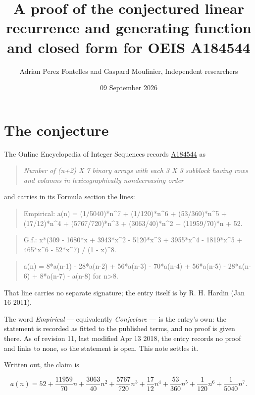 \documentclass[11pt]{article}
\title{A proof of the conjectured linear recurrence and generating function and closed form for OEIS A184544}
\author{Adrian Perez Fontelles and Gaspard Moulinier, Independent researchers}
\date{09 September 2026}
\theoremstyle{definition}
\begin{document}
\maketitle
\section{The conjecture}

The Online Encyclopedia of Integer Sequences records \href{https://oeis.org/A184544}{A184544} as

\begin{quote}\itshape Number of (n+2) X 7 binary arrays with each 3 X 3 subblock having rows and columns in lexicographically nondecreasing order\end{quote}

and carries in its Formula section the lines:

\begin{quote}\ttfamily Empirical: a(n) = (1/5040)*n\textasciicircum{}7 + (1/120)*n\textasciicircum{}6 + (53/360)*n\textasciicircum{}5 + (17/12)*n\textasciicircum{}4 + (5767/720)*n\textasciicircum{}3 + (3063/40)*n\textasciicircum{}2 + (11959/70)*n + 52.\end{quote}

\begin{quote}\ttfamily G.f.: x*(309 - 1680*x + 3943*x\textasciicircum{}2 - 5120*x\textasciicircum{}3 + 3955*x\textasciicircum{}4 - 1819*x\textasciicircum{}5 + 465*x\textasciicircum{}6 - 52*x\textasciicircum{}7) / (1 - x)\textasciicircum{}8.\end{quote}

\begin{quote}\ttfamily a(n) = 8*a(n-1) - 28*a(n-2) + 56*a(n-3) - 70*a(n-4) + 56*a(n-5) - 28*a(n-6) + 8*a(n-7) - a(n-8) for n>8.\end{quote}

That line carries no separate signature; the entry itself is by R. H. Hardin (Jan 16 2011).

The word {\itshape Empirical} --- equivalently {\itshape Conjecture} --- is the entry's own: the statement is recorded as fitted to the published terms, and no proof is given there. As of revision 11, last modified Apr 13 2018, the entry records no proof and links to none, so the statement is open. This note settles it.

Written out, the claim is

\[a(n) = 52 + \frac{11959}{70}n + \frac{3063}{40}n^{2} + \frac{5767}{720}n^{3} + \frac{17}{12}n^{4} + \frac{53}{360}n^{5} + \frac{1}{120}n^{6} + \frac{1}{5040}n^{7}.\]
\end{document}
